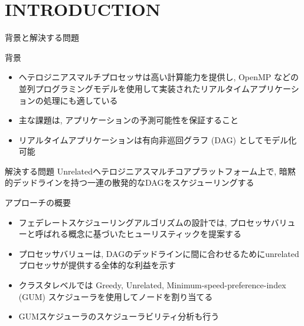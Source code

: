 
\section{INTRODUCTION}
\label{sec: introduction}

\begin{frame}{背景と解決する問題}
    \begin{block}{背景}
        \setlength{\linewidth}{0.98\columnwidth}
        \begin{itemize}
            \item ヘテロジニアスマルチプロセッサは高い計算能力を提供し, OpenMP などの並列プログラミングモデルを使用して実装されたリアルタイムアプリケーションの処理にも適している
            \item 主な課題は, アプリケーションの予測可能性を保証すること
            \item リアルタイムアプリケーションは有向非巡回グラフ (DAG) としてモデル化可能
        \end{itemize}
    \end{block}
    \begin{block}{解決する問題}
        Unrelatedヘテロジニアスマルチコアプラットフォーム上で, 暗黙的デッドラインを持つ一連の散発的なDAGをスケジューリングする
    \end{block}
\end{frame}

\begin{frame}{アプローチの概要}
    \begin{itemize}
        \item フェデレートスケジューリングアルゴリズムの設計では, プロセッサバリューと呼ばれる概念に基づいたヒューリスティックを提案する
        \item プロセッサバリューは, DAGのデッドラインに間に合わせるためにunrelatedプロセッサが提供する全体的な利益を示す
        \item クラスタレベルでは Greedy, Unrelated, Minimum-speed-preference-index (GUM) スケジューラを使用してノードを割り当てる
        \item GUMスケジューラのスケジューラビリティ分析も行う
    \end{itemize}
\end{frame}
